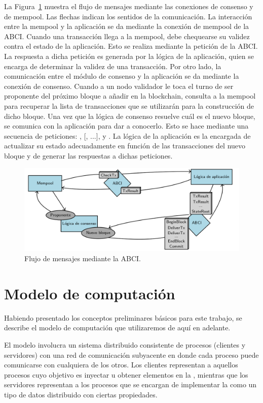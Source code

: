 La Figura~\ref{fig:abci_flow} muestra el flujo de mensajes mediante las conexiones de consenso y de mempool.
%
Las flechas indican los sentidos de la comunicación.
%
La interacción entre la mempool y la aplicación se da mediante la conexión de mempool de la ABCI.
%
Cuando una transacción llega a la mempool, debe chequearse su validez contra el estado de la aplicación.
%
Esto se realiza mediante la petición \CheckTx de la ABCI.
%
La respuesta a dicha petición es generada por la lógica de la aplicación, quien se encarga de determinar la
validez de una transacción.
%
Por otro lado, la comunicación entre el módulo de consenso y la aplicación se da mediante la conexión de consenso.
%
Cuando a un nodo validador le toca el turno de ser proponente del próximo bloque a añadir en la blockchain,
consulta a la mempool para recuperar la lista de transacciones que se utilizarán para la construcción 
de dicho bloque.
%
Una vez que la lógica de consenso resuelve cuál es el nuevo bloque, se comunica con la aplicación para
dar a conocerlo.
%
Esto se hace mediante una secuencia de peticiones: \BeginBlock, [\DeliverTx, ...], \EndBlock y \Commit.
%
La lógica de la aplicación es la encargada de actualizar su estado adecuadamente en función de las transacciones del
nuevo bloque y de generar las respuestas a dichas peticiones.


\begin{figure}
  \centering
  \includegraphics[scale=0.35]{figures/abci_msg_flow.png}
  \caption{Flujo de mensajes mediante la ABCI.}
  \label{fig:abci_flow}
\end{figure}


\section{Modelo de computación}\label{sec:model_system}
Habiendo presentado los conceptos preliminares básicos para este trabajo, se describe
el modelo de computación que utilizaremos de aquí en adelante.

El modelo involucra un sistema distribuido consistente de procesos (clientes y servidores) con una
red de comunicación subyacente en donde cada proceso puede comunicarse con cualquiera de los otros.
Los clientes representan a aquellos procesos cuyo objetivo es inyectar u obtener elementos en la \setchain,
mientras que los servidores representan a los procesos que se encargan de implementar la \setchain
como un tipo de datos distribuido con ciertas propiedades.

